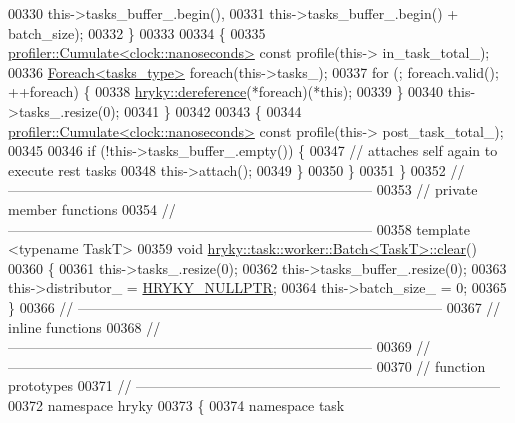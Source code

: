 \begin{DoxyCode}
00330             this->tasks\_buffer\_.begin(),
00331             this->tasks\_buffer\_.begin() + batch\_size);
00332     \}
00333 
00334     \{
00335         \hyperlink{classhryky_1_1profiler_1_1_cumulate}{profiler::Cumulate<clock::nanoseconds>} \textcolor{keyword}{const} profile(this->
      in\_task\_total\_);
00336         \hyperlink{classhryky_1_1_foreach}{Foreach<tasks_type>} \textcolor{keywordflow}{foreach}(this->tasks\_);
00337         \textcolor{keywordflow}{for} (; \textcolor{keywordflow}{foreach}.valid(); ++\textcolor{keywordflow}{foreach}) \{
00338             \hyperlink{group__generic__programming_ga74adf3223a4335c89d64f985d0bcc29e}{hryky::dereference}(*\textcolor{keywordflow}{foreach})(*this);
00339         \}
00340         this->tasks\_.resize(0);
00341     \}
00342 
00343     \{
00344         \hyperlink{classhryky_1_1profiler_1_1_cumulate}{profiler::Cumulate<clock::nanoseconds>} \textcolor{keyword}{const} profile(this->
      post\_task\_total\_);
00345 
00346         \textcolor{keywordflow}{if} (!this->tasks\_buffer\_.empty()) \{
00347             \textcolor{comment}{// attaches self again to execute rest tasks}
00348             this->attach();
00349         \}
00350     \}
00351 \}
00352 \textcolor{comment}{//
      ------------------------------------------------------------------------------}
00353 \textcolor{comment}{// private member functions}
00354 \textcolor{comment}{//
      ------------------------------------------------------------------------------}
00358 \textcolor{comment}{}\textcolor{keyword}{template} <\textcolor{keyword}{typename} TaskT>
00359 \textcolor{keywordtype}{void} \hyperlink{namespacehryky_aa201297ea9530da954a7230be71cc19d}{hryky::task::worker::Batch<TaskT>::clear}()
00360 \{
00361     this->tasks\_.resize(0);
00362     this->tasks\_buffer\_.resize(0);
00363     this->distributor\_ = \hyperlink{common_8h_a4cd4ac09cfcdbd6b30ee69afc156e210}{HRYKY_NULLPTR};
00364     this->batch\_size\_ = 0;
00365 \}
00366 \textcolor{comment}{//
      ------------------------------------------------------------------------------}
00367 \textcolor{comment}{// inline functions}
00368 \textcolor{comment}{//
      ------------------------------------------------------------------------------}
00369 \textcolor{comment}{//
      ------------------------------------------------------------------------------}
00370 \textcolor{comment}{// function prototypes}
00371 \textcolor{comment}{//
      ------------------------------------------------------------------------------}
00372 \textcolor{keyword}{namespace }hryky
00373 \{
00374 \textcolor{keyword}{namespace }task

\end{DoxyCode}
